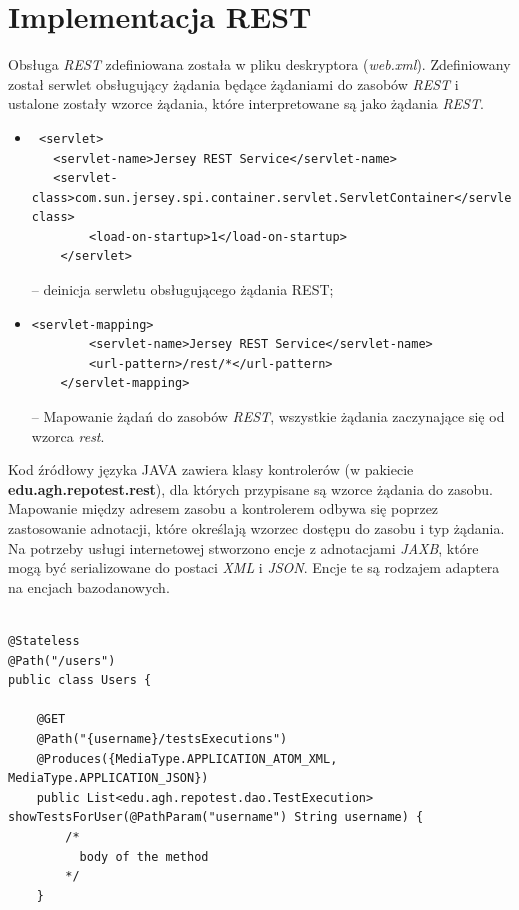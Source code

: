 \newpage
\section{Implementacja REST}

Obsługa \textit{REST} zdefiniowana została w pliku deskryptora (\textit{web.xml}). Zdefiniowany został serwlet obsługujący żądania będące żądaniami do zasobów \textit{REST} i ustalone zostały wzorce żądania, które interpretowane są jako żądania \textit{REST}. 
\begin{itemize}
	\item  {\footnotesize \begin{verbatim} <servlet>
   <servlet-name>Jersey REST Service</servlet-name>
   <servlet-class>com.sun.jersey.spi.container.servlet.ServletContainer</servlet-class>
        <load-on-startup>1</load-on-startup>
    </servlet> \end{verbatim}} -- deinicja serwletu obsługującego żądania REST;
 	\item  {\footnotesize \begin{verbatim}<servlet-mapping>
        <servlet-name>Jersey REST Service</servlet-name>
        <url-pattern>/rest/*</url-pattern>
    </servlet-mapping>\end{verbatim}} -- Mapowanie żądań do zasobów \textit{REST}, wszystkie żądania zaczynające się od wzorca \textit{rest}.
  \end{itemize}
  
  
  Kod źródłowy języka JAVA zawiera klasy kontrolerów (w pakiecie \textbf{edu.agh.repotest.rest}), dla których przypisane są wzorce żądania do zasobu. Mapowanie między adresem zasobu a kontrolerem odbywa się poprzez zastosowanie adnotacji, które określają wzorzec dostępu do zasobu i typ żądania. Na potrzeby usługi internetowej stworzono encje z adnotacjami \textit{JAXB}, które mogą być serializowane do postaci \textit{XML} i \textit{JSON}. Encje te są rodzajem adaptera na encjach bazodanowych.
 
  
 \begin{lstlisting}[caption=Pobranie testów do wykonania dla użytkownika,label=lst:pobranieTestow]

@Stateless
@Path("/users")
public class Users {

    @GET
    @Path("{username}/testsExecutions")
    @Produces({MediaType.APPLICATION_ATOM_XML, MediaType.APPLICATION_JSON})
    public List<edu.agh.repotest.dao.TestExecution> showTestsForUser(@PathParam("username") String username) {
        /*
          body of the method
        */
    }

\end{lstlisting}
 
